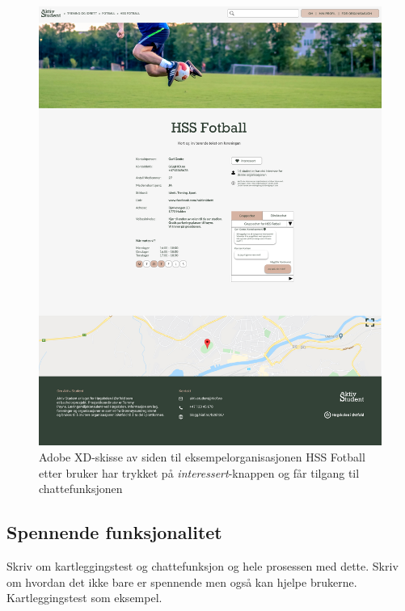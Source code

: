 \begin{figure}[H]
\centering
\includegraphics[width=.7\textwidth]{Illustrasjoner/Skisser-pdf/3.0/3-6-organisasjonsside-trykket-interessert.pdf}
\caption{Adobe XD-skisse av siden til eksempelorganisasjonen HSS Fotball etter bruker har trykket på {\em interessert}-knappen og får tilgang til chattefunksjonen}
\label{fig:3-6-org-trykket-interessert}
\end{figure}

\subsection{Spennende funksjonalitet}
Skriv om kartleggingstest og chattefunksjon og hele prosessen med dette. Skriv om hvordan det ikke bare er spennende men også kan hjelpe brukerne. Kartleggingstest som eksempel.

